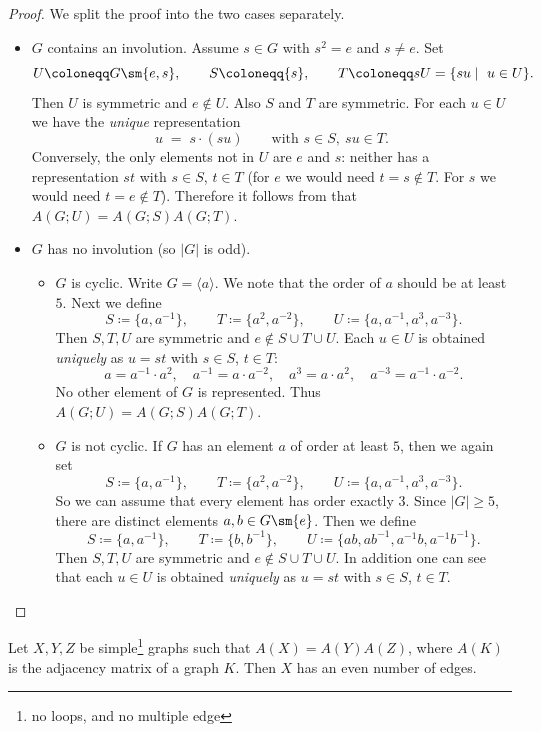 \documentclass{file}
\begin{document}
\begin{proof}
We split the proof into the two cases separately.
\begin{itemize}
\item $G$ contains an involution.
Assume $s\in G$ with $s^2=e$ and $s\neq e$.
Set
\[
U\coloneqq G\sm\{e,s\}, \qquad S\coloneqq \{s\}, \qquad T\coloneqq sU=\{su\mid \ u\in U\}.
\]
Then $U$ is symmetric and $e\notin U$. Also $S$ and $T$ are symmetric.
For each $u\in U$ we have the \emph{unique} representation
\[
u \;=\; s\cdot (su)\qquad\text{with }s\in S,\ su\in T.
\]
Conversely, the only elements not in $U$ are $e$ and $s$: neither has a representation $st$
with $s\in S$, $t\in T$ (for $e$ we would need $t=s\notin T$.
For $s$ we would need $t=e\notin T$).
Therefore it follows from  that $A(G;U)=A(G;S)A(G;T)$.
\item  $G$ has no involution (so $|G|$ is odd).
\begin{itemize}
\item $G$ is cyclic.
Write $G=\langle a\rangle$. We note that the order of $a$ should be at least $5$. 
Next we define
\[
S\coloneqq \{a,a^{-1}\},\qquad T\coloneqq \{a^{2},a^{-2}\},\qquad
U\coloneqq \{a,a^{-1},a^{3},a^{-3}\}.
\]
Then $S,T,U$ are symmetric and $e\notin S\cup T\cup U$.
Each $u\in U$ is obtained \emph{uniquely} as $u=st$ with $s\in S$, $t\in T$:
\[
a = a^{-1}\cdot a^{2},\quad a^{-1}=a\cdot a^{-2},\quad
a^{3}=a\cdot a^{2},\quad a^{-3}=a^{-1}\cdot a^{-2}.
\]
No other element of $G$ is represented. Thus $A(G;U)=A(G;S)A(G;T)$.
\item  $G$ is not cyclic.
If $G$ has an element $a$ of order at least $5$, then we again set
\[
S\coloneqq \{a,a^{-1}\},\qquad T\coloneqq \{a^{2},a^{-2}\},\qquad
U\coloneqq \{a,a^{-1},a^{3},a^{-3}\}.
\]
So we can assume that every element has order exactly $3$.
Since $|G|\geq 5$, there are distinct elements $a,b \in G\sm \{e\}$.
Then we define 
\[
S\coloneqq \{a,a^{-1}\},\qquad T\coloneqq \{b,b^{-1}\},\qquad
U\coloneqq \{ab,ab^{-1},a^{-1}b,a^{-1}b^{-1}\}.
\]
Then $S,T,U$ are symmetric and $e\notin S\cup T\cup U$.
In addition one can see that each $u\in U$ is obtained \emph{uniquely} as $u=st$ with $s\in S$, $t\in T$.\qedhere
\end{itemize}
\end{itemize}
\end{proof}


\begin{lem}{\rm\cite[Theorem 4]{Manjunatha}}\label{odd-edges}
Let $X, Y, Z$ be simple\footnote{no loops, and no multiple edge} graphs such that $A(X)=A(Y)A(Z)$, where $A(K)$ is the adjacency matrix of a graph $K$.
Then $ X $ has an even number of edges.
\end{lem}
\end{document}
